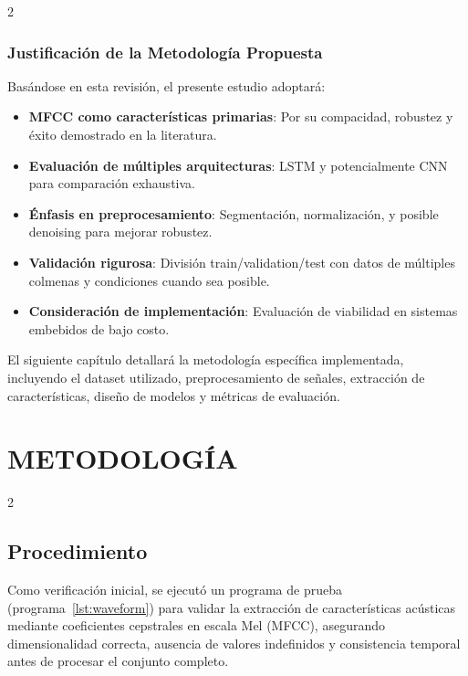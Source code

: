 \documentclass[12pt]{report}
\newenvironment{tightmulticols}{%
  \begin{multicols}{2}
  \setlength{\parskip}{1.2pt}
  \linespread{1}\selectfont
}{%
  \end{multicols}
}
\begin{document}
\begin{tightmulticols}
\subsection{Justificación de la Metodología Propuesta}

\noindent Basándose en esta revisión, el presente estudio adoptará:
\begin{itemize}
    \item \textbf{MFCC como características primarias}: Por su compacidad, robustez y éxito demostrado en la literatura.
    \item \textbf{Evaluación de múltiples arquitecturas}: LSTM y potencialmente CNN para comparación exhaustiva.
    \item \textbf{Énfasis en preprocesamiento}: Segmentación, normalización, y posible denoising para mejorar robustez.
    \item \textbf{Validación rigurosa}: División train/validation/test con datos de múltiples colmenas y condiciones cuando sea posible.
    \item \textbf{Consideración de implementación}: Evaluación de viabilidad en sistemas embebidos de bajo costo.
\end{itemize}
\noindent El siguiente capítulo detallará la metodología específica implementada, incluyendo el dataset utilizado, preprocesamiento de señales, extracción de características, diseño de modelos y métricas de evaluación.

\end{tightmulticols}


\pagebreak
\chapter{METODOLOGÍA}
\vspace{-3em}


\begin{tightmulticols}

\section{Procedimiento}

\noindent Como verificación inicial, se ejecutó un programa de prueba (programa~\ref{lst:waveform}) para validar la extracción de características acústicas mediante coeficientes cepstrales en escala Mel (MFCC), asegurando dimensionalidad correcta, ausencia de valores indefinidos y consistencia temporal antes de procesar el conjunto completo.

\end{tightmulticols}
\end{document}
